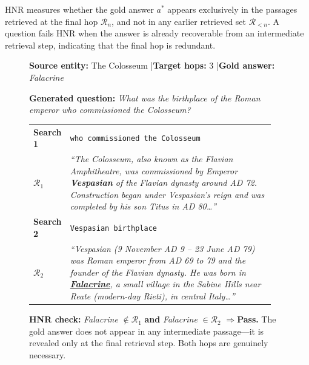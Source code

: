 \documentclass{article}
\begin{document}
HNR measures whether the gold answer $a^\ast$ appears
exclusively in the passages retrieved at the final hop $\mathcal{R}_n$, and not
in any earlier retrieved set $\mathcal{R}_{<n}$. A question fails HNR when the
answer is already recoverable from an intermediate retrieval step, indicating
that the final hop is redundant.

\begin{figure}[t]
\centering
\begin{tcolorbox}[appbox,title={Hop Necessity Rate: Illustrative Examples},width=\textwidth]
\small

\begin{tcolorbox}[judgebox,title={HNR Pass: Genuine 3-Hop Chain}]
\small
\textbf{Source entity:} The Colosseum \quad|\quad \textbf{Target hops:} 3 \quad|\quad \textbf{Gold answer:} \textit{Falacrine}

\smallskip
\textbf{Generated question:} \emph{What was the birthplace of the Roman emperor who commissioned the Colosseum?}

\medskip
\begin{tabular}{@{}p{0.10\linewidth}p{0.84\linewidth}@{}}
\textbf{Search 1} & \texttt{who commissioned the Colosseum} \\[1mm]
$\mathcal{R}_1$ &
\begin{minipage}[t]{\linewidth}
\small\itshape
``The Colosseum, also known as the Flavian Amphitheatre, was commissioned by Emperor \textbf{Vespasian} of the Flavian dynasty around AD 72. Construction began under Vespasian's reign and was completed by his son Titus in AD 80\ldots''
\end{minipage}\\[3mm]
\textbf{Search 2} & \texttt{Vespasian birthplace} \\[1mm]
$\mathcal{R}_2$ &
\begin{minipage}[t]{\linewidth}
\small\itshape
``Vespasian (9 November AD 9 -- 23 June AD 79) was Roman emperor from AD 69 to 79 and the founder of the Flavian dynasty. He was born in \textbf{\underline{Falacrine}}, a small village in the Sabine Hills near Reate (modern-day Rieti), in central Italy\ldots''
\end{minipage}\\
\end{tabular}

\medskip
\textbf{HNR check:} \emph{Falacrine} $\notin \mathcal{R}_1$ \;\textbf{and}\; \emph{Falacrine} $\in \mathcal{R}_2$ \quad$\Rightarrow$\quad \textcolor{green!50!black}{\textbf{Pass.}}
The gold answer does not appear in any intermediate passage---it is revealed only at the final retrieval step. Both hops are genuinely necessary.
\end{tcolorbox}


\end{tcolorbox}
\end{figure}
\end{document}
